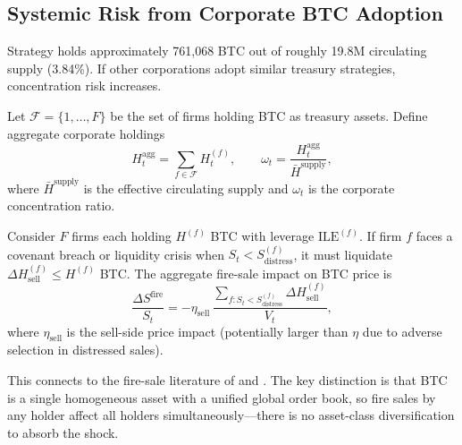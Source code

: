 \subsection{Systemic Risk from Corporate BTC Adoption}
\label{subsec:systemic}

Strategy holds approximately 761{,}068 BTC out of roughly 19.8M
circulating supply (3.84\%). If other corporations adopt similar
treasury strategies, concentration risk increases.

\begin{definition}
Let $\mathcal{F} = \{1, \ldots, F\}$ be the set of firms holding BTC
as treasury assets. Define aggregate corporate holdings
\begin{equation}
  H_t^{\mathrm{agg}} = \sum_{f \in \mathcal{F}} H_t^{(f)},
  \qquad
  \omega_t = \frac{H_t^{\mathrm{agg}}}{\bar{H}^{\mathrm{supply}}},
  \label{eq:aggregate_holdings}
\end{equation}
where $\bar{H}^{\mathrm{supply}}$ is the effective circulating supply
and $\omega_t$ is the corporate concentration ratio.
\end{definition}

\begin{proposition}
\label{prop:fire_sale}
Consider $F$ firms each holding $H^{(f)}$ BTC with leverage
$\mathrm{ILE}^{(f)}$. If firm $f$ faces a covenant breach or
liquidity crisis when $S_t < S^{(f)}_{\mathrm{distress}}$, it must
liquidate $\Delta H^{(f)}_{\mathrm{sell}} \le H^{(f)}$ BTC.
The aggregate fire-sale impact on BTC price is
\begin{equation}
  \frac{\Delta S^{\mathrm{fire}}}{S_t}
  = -\eta_{\mathrm{sell}}\,
  \frac{\sum_{f: S_t < S^{(f)}_{\mathrm{distress}}} \Delta H^{(f)}_{\mathrm{sell}}}{V_t},
  \label{eq:fire_sale}
\end{equation}
where $\eta_{\mathrm{sell}}$ is the sell-side price impact (potentially
larger than $\eta$ due to adverse selection in distressed sales).
\end{proposition}

This connects to the fire-sale literature of \citet{shleifer1997limits}
and \citet{shleifer2011fire}. The key distinction is that
BTC is a single homogeneous asset with a unified global order book,
so fire sales by any holder affect all holders simultaneously---there
is no asset-class diversification to absorb the shock.

